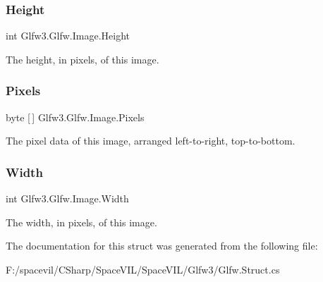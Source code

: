 \subsubsection{\texorpdfstring{Height}{Height}}
{\footnotesize\ttfamily int Glfw3.\+Glfw.\+Image.\+Height}



The height, in pixels, of this image. 

\mbox{\label{struct_glfw3_1_1_glfw_1_1_image_a419d6f51ba261e2cd24f075be7db6024}} 
\subsubsection{\texorpdfstring{Pixels}{Pixels}}
{\footnotesize\ttfamily byte \mbox{[}$\,$\mbox{]} Glfw3.\+Glfw.\+Image.\+Pixels}



The pixel data of this image, arranged left-\/to-\/right, top-\/to-\/bottom. 

\mbox{\label{struct_glfw3_1_1_glfw_1_1_image_a2be52a618928d3ac669ece202178770a}} 
\subsubsection{\texorpdfstring{Width}{Width}}
{\footnotesize\ttfamily int Glfw3.\+Glfw.\+Image.\+Width}



The width, in pixels, of this image. 



The documentation for this struct was generated from the following file\+:\begin{DoxyCompactItemize}
\item 
F\+:/spacevil/\+C\+Sharp/\+Space\+V\+I\+L/\+Space\+V\+I\+L/\+Glfw3/Glfw.\+Struct.\+cs\end{DoxyCompactItemize}
